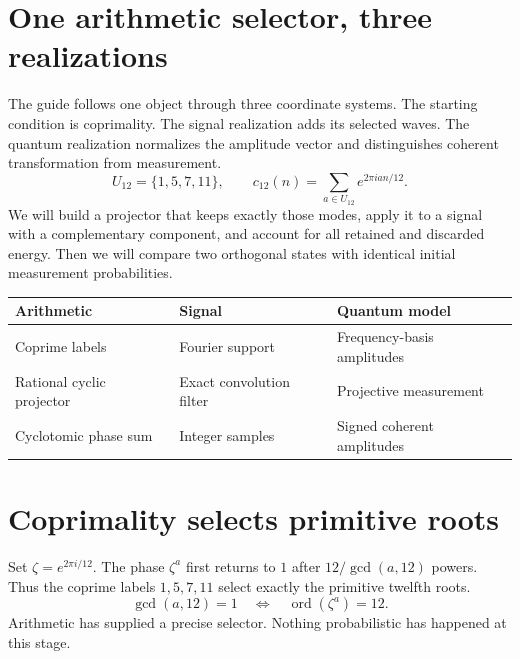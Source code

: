 \clearpage\section*{One arithmetic selector, three realizations}
The guide follows one object through three coordinate systems. The starting condition is coprimality. The signal realization adds its selected waves. The quantum realization normalizes the amplitude vector and distinguishes coherent transformation from measurement.
\[
 U_{12}=\{1,5,7,11\},\qquad
 c_{12}(n)=\sum_{a\in U_{12}}e^{2\pi ian/12}.
\]
We will build a projector that keeps exactly those modes, apply it to a signal with a complementary component, and account for all retained and discarded energy. Then we will compare two orthogonal states with identical initial measurement probabilities.
\begin{center}
\begin{tabular}{lll}\toprule
Arithmetic & Signal & Quantum model\\\midrule
Coprime labels & Fourier support & Frequency-basis amplitudes\\
Rational cyclic projector & Exact convolution filter & Projective measurement\\
Cyclotomic phase sum & Integer samples & Signed coherent amplitudes\\\bottomrule
\end{tabular}
\end{center}

\clearpage\section*{Coprimality selects primitive roots}
Set $\zeta=e^{2\pi i/12}$. The phase $\zeta^a$ first returns to $1$ after $12/\gcd(a,12)$ powers. Thus the coprime labels $1,5,7,11$ select exactly the primitive twelfth roots.
\[
 \gcd(a,12)=1\quad\Longleftrightarrow\quad\operatorname{ord}(\zeta^a)=12.
\]
Arithmetic has supplied a precise selector. Nothing probabilistic has happened at this stage.

